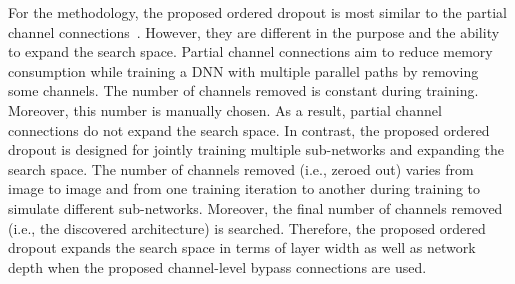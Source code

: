 For the methodology, the proposed ordered dropout is most similar to the partial channel connections~\cite{Xu2020PC-DARTS}. However, they are different in the purpose and the ability to expand the search space. Partial channel connections aim to reduce memory consumption while training a DNN with multiple parallel paths by removing some channels. The number of channels removed is constant during training. Moreover, this number is manually chosen. As a result, partial channel connections do not expand the search space. In contrast, the proposed ordered dropout is designed for jointly training multiple sub-networks and expanding the search space. The number of channels removed (i.e., zeroed out) varies from image to image and from one training iteration to another during training to simulate different sub-networks. Moreover, the final number of channels removed (i.e., the discovered architecture) is searched. Therefore, the proposed ordered dropout expands the search space in terms of layer width as well as network depth when the proposed channel-level bypass connections are used.